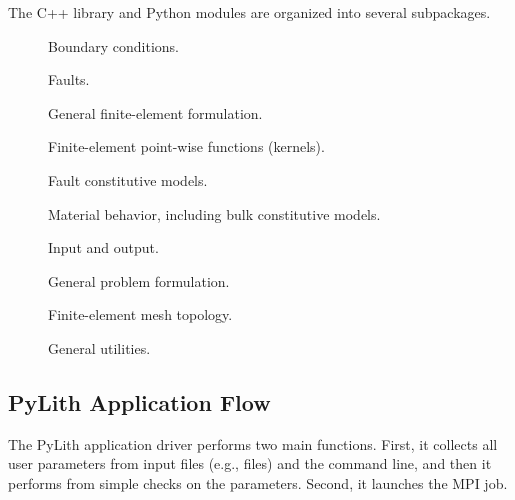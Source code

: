 The C++ library and Python modules are organized into several
subpackages.

\begin{description}
\item[] Boundary conditions.
\item[] Faults.
\item[] General finite-element formulation.
\item[] Finite-element point-wise functions (kernels).
\item[] Fault constitutive models.
\item[] Material behavior, including bulk constitutive models.
\item[] Input and output.
\item[] General problem formulation.
\item[] Finite-element mesh topology.
\item[] General utilities.
\end{description}

\subsection{PyLith Application Flow}

The PyLith application driver performs two main functions. First, it
collects all user parameters from input files (e.g., 
files) and the command line, and then it performs from simple checks
on the parameters. Second, it launches the MPI job.

